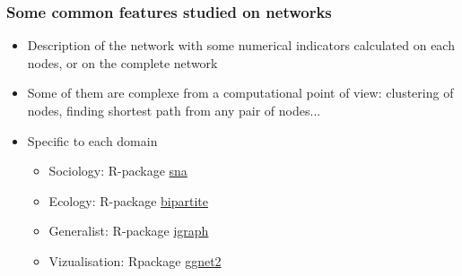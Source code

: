 \documentclass[compress,10pt]{beamer}
\begin{document}
\begin{frame}\frametitle{Some common features studied on networks}

\begin{itemize}
\item Description of the network with some numerical indicators calculated on each nodes, or on the complete network
\item Some of them are complexe from a computational point of view: clustering of nodes, finding shortest path from any pair of nodes...   
\item Specific to each domain
  \begin{itemize}
  \item Sociology: R-package \href{https://cran.r-project.org/web/packages/sna/index.html}{sna} 
  \item Ecology: R-package \href{https://cran.r-project.org/web/packages/bipartite/index.html}{bipartite} 
  \item Generalist: R-package \href{https://igraph.org/r/doc/aaa-igraph-package.html}{igraph}
  \item Vizualisation: Rpackage \href{https://briatte.github.io/ggnet/}{ggnet2}
  \end{itemize}
  
\end{itemize}
\end{frame}
\end{document}

